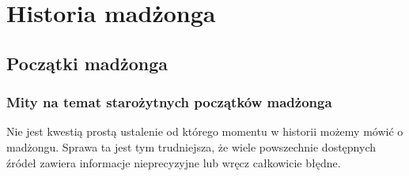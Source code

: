 \chapter{Historia madżonga}
\section{Początki madżonga}
\subsection{Mity na temat starożytnych początków madżonga}
Nie jest kwestią prostą ustalenie od którego momentu w historii możemy mówić o
madżongu. Sprawa ta jest tym trudniejsza, że wiele powszechnie dostępnych źródeł
zawiera informacje nieprecyzyjne lub wręcz całkowicie błędne. 

